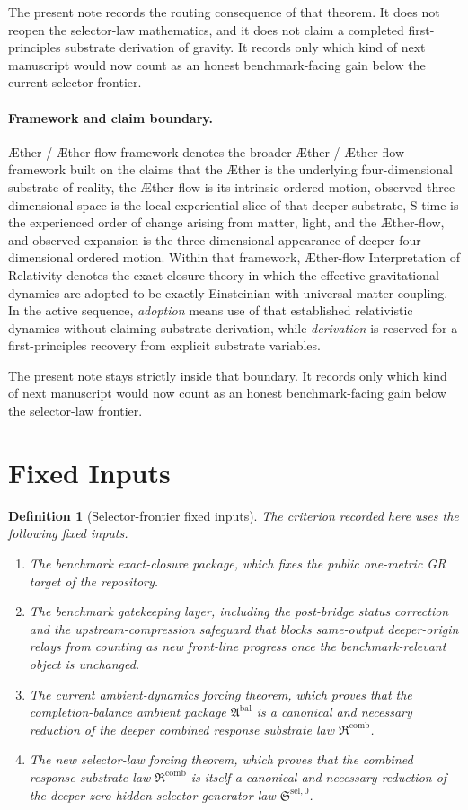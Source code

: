 \documentclass[11pt]{article}
\newcommand{\Aether}{\AE{}ther}
\newcommand{\Aflow}{\AE{}ther-flow}
\newcommand{\TheoryName}{\Aflow{} Interpretation of Relativity}
\newcommand{\TheoryProgram}{\Aether{} / \Aflow{} framework}
\newcommand{\AmbientPackage}{\mathfrak A^{\mathrm{bal}}}
\newcommand{\CombinedLaw}{\mathfrak R^{\mathrm{comb}}}
\newcommand{\SelectorLaw}{\mathfrak S^{\mathrm{sel},0}}
\newtheorem{definition}{Definition}
\begin{document}
The present note records the routing consequence of that theorem. It does not reopen the selector-law mathematics, and it does not claim a completed first-principles substrate derivation of gravity. It records only which kind of next manuscript would now count as an honest benchmark-facing gain below the current selector frontier.

\paragraph{Framework and claim boundary.}
\TheoryProgram{} denotes the broader \Aether{} / \Aflow{} framework built on the claims that the \Aether{} is the underlying four-dimensional substrate of reality, the \Aflow{} is its intrinsic ordered motion, observed three-dimensional space is the local experiential slice of that deeper substrate, S-time is the experienced order of change arising from matter, light, and the \Aflow{}, and observed expansion is the three-dimensional appearance of deeper four-dimensional ordered motion. Within that framework, \TheoryName{} denotes the exact-closure theory in which the effective gravitational dynamics are adopted to be exactly Einsteinian with universal matter coupling. In the active sequence, \emph{adoption} means use of that established relativistic dynamics without claiming substrate derivation, while \emph{derivation} is reserved for a first-principles recovery from explicit substrate variables.

The present note stays strictly inside that boundary. It records only which kind of next manuscript would now count as an honest benchmark-facing gain below the selector-law frontier.

\section{Fixed Inputs}

\begin{definition}[Selector-frontier fixed inputs]
The criterion recorded here uses the following fixed inputs.
\begin{enumerate}
    \item The benchmark exact-closure package, which fixes the public one-metric GR target of the repository.
    \item The benchmark gatekeeping layer, including the post-bridge status correction and the upstream-compression safeguard that blocks same-output deeper-origin relays from counting as new front-line progress once the benchmark-relevant object is unchanged.
    \item The current ambient-dynamics forcing theorem, which proves that the completion-balance ambient package \(\AmbientPackage\) is a canonical and necessary reduction of the deeper combined response substrate law \(\CombinedLaw\).
    \item The new selector-law forcing theorem, which proves that the combined response substrate law \(\CombinedLaw\) is itself a canonical and necessary reduction of the deeper zero-hidden selector generator law \(\SelectorLaw\).
\end{enumerate}
\end{definition}
\end{document}
